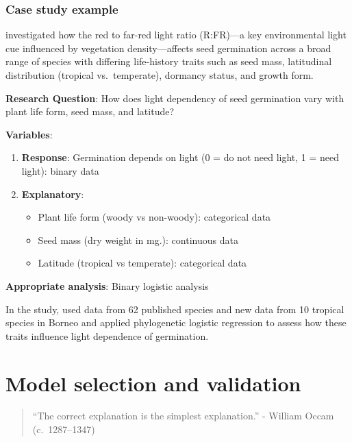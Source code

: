 \documentclass[
]{book}
\providecommand{\tightlist}{%
  \setlength{\itemsep}{0pt}\setlength{\parskip}{0pt}}
\begin{document}
\subsubsection{Case study example}\label{case-study-example}

\citet{tiansawat2013} investigated how the red to far-red light ratio (R:FR)---a key environmental light cue influenced by vegetation density---affects seed germination across a broad range of species with differing life-history traits such as seed mass, latitudinal distribution (tropical vs.~temperate), dormancy status, and growth form.

\textbf{Research Question}: How does light dependency of seed germination vary with plant life form, seed mass, and latitude?

\textbf{Variables}:

\begin{enumerate}
\def\labelenumi{\arabic{enumi}.}
\tightlist
\item
  \textbf{Response}: Germination depends on light (0 = do not need light, 1 = need light): binary data
\item
  \textbf{Explanatory}:

  \begin{itemize}
  \tightlist
  \item
    Plant life form (woody vs non-woody): categorical data
  \item
    Seed mass (dry weight in mg.): continuous data
  \item
    Latitude (tropical vs temperate): categorical data
  \end{itemize}
\end{enumerate}

\textbf{Appropriate analysis}: Binary logistic analysis

In the study, \citet{tiansawat2013} used data from 62 published species and new data from 10 tropical species in Borneo and applied phylogenetic logistic regression to assess how these traits influence light dependence of germination.

\section{Model selection and validation}\label{model-selection-and-validation}

\begin{quote}
``The correct explanation is the simplest explanation.'' - William Occam (c.~1287--1347)
\end{quote}
\end{document}
